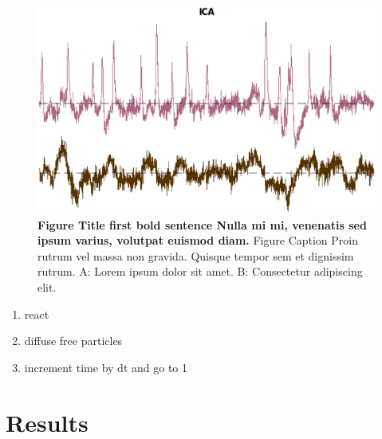 \documentclass[10pt,letterpaper]{article}
\begin{document}
\begin{figure}[h]
\includegraphics[width=5.0in]{img/components.eps}
\caption{{\bf Figure Title first bold sentence Nulla mi mi, venenatis sed ipsum varius, volutpat euismod diam.}
Figure Caption Proin rutrum vel massa non gravida. Quisque tempor sem et dignissim rutrum. A: Lorem ipsum dolor sit amet. B: Consectetur adipiscing elit.}
\label{fig2}
\end{figure}

\begin{enumerate}
\item{react}
\item{diffuse free particles}
\item{increment time by dt and go to 1}
\end{enumerate}

\section*{Results}
\end{document}
